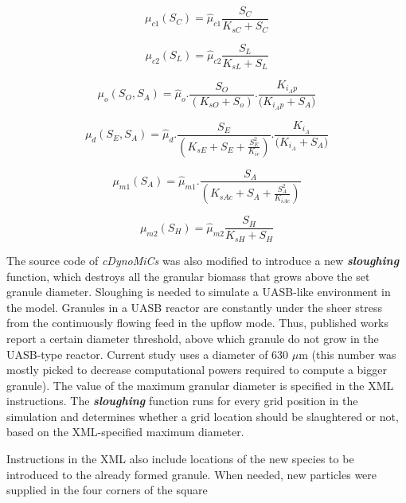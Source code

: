 \begin{equation}
\mu_{c1}(S_{C})={\hat{\mu}_{c1}}\frac{{S_{C}}}{{K_{sC}+S_{C}}}
\label{cellobiosedegradation}
\end{equation}

\begin{equation}
\mu_{c2}(S_{L})={\hat{\mu}_{c2}}\frac{{S_{L}}}{{K_{sL}+S_{L}}}
\label{lactatedegradation}
\end{equation}

\begin{equation}
\mu_{o}(S_{O}, S_{A})=\hat{\mu}_{o}.\frac{{S_{O}}}{{(K_{sO}+S_{o})}}.\frac{K_{i_Ap}}
{{(K_{i_Ap}+S_{A}})}
\label{oleatedegradation}
\end{equation}

\begin{equation}
\mu_{d}(S_{E}, S_{A})=\hat{\mu}_{d}.\frac{{S_{E}}}{{(K_{sE}+S_{E}+\frac{S_{E}^{2}}{K_{ie}})}}.\frac{K_{i_A}}
{{(K_{i_A}+S_{A}})}
\label{ethanoldegradation}
\end{equation}

\begin{equation}
\mu_{m1}(S_{A})=\hat{\mu}_{m1}.\frac{{S_{A}}}{{(K_{sAc}+S_{A}+\frac{S_{A}^{2}}{K_{iAc}})}}
\label{acetatedegradation}
\end{equation}

\begin{equation}
\mu_{m2}(S_{H})={\hat{\mu}_{m2}}\frac{{S_{H}}}{{K_{sH}+S_{H}}}
\label{hydrogendegradation}
\end{equation}

The source code of \textsl{cDynoMiCs} was also modified to introduce a new \textbf{\textit{sloughing}} function, which destroys all the granular biomass that grows above the set granule diameter. Sloughing is needed to simulate a UASB-like environment in the model. Granules in a UASB reactor are constantly under the sheer stress from the continuously flowing feed in the upflow mode. Thus, published works report a certain diameter threshold, above which granule do not grow in the UASB-type reactor. Current study uses a diameter of 630 $\mu$m (this number was mostly picked to decrease computational powers required to compute a bigger granule). The value of the maximum granular diameter is specified in the XML instructions. The \textbf{\textit{sloughing}} function runs for every grid position in the simulation and determines whether a grid location should be slaughtered or not, based on the XML-specified maximum diameter. 

Instructions in the XML also include locations of the new species to be introduced to the already formed granule. When needed, new particles were supplied in the four corners of the square 

